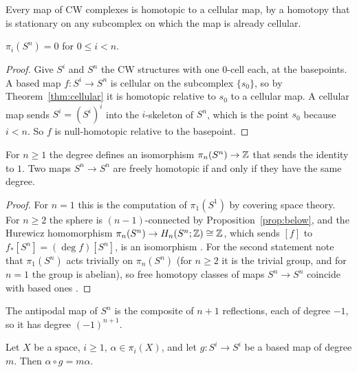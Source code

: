 \begin{theorem}\label{thm:cellular}
Every map of CW complexes is homotopic to a cellular map, by a homotopy that is stationary on any subcomplex on which the map is already cellular.
\end{theorem}

\begin{proposition}\label{prop:below}
$\pi_i(S^n)=0$ for $0\le i<n$.
\end{proposition}

\begin{proof}
Give $S^i$ and $S^n$ the CW structures with one $0$-cell each, at the basepoints. A based map $f\colon S^i\to S^n$ is cellular on the subcomplex $\{s_0\}$, so by Theorem~\ref{thm:cellular} it is homotopic relative to $s_0$ to a cellular map. A cellular map sends $S^i=(S^i)^i$ into the $i$-skeleton of $S^n$, which is the point $s_0$ because $i<n$. So $f$ is null-homotopic relative to the basepoint.
\end{proof}

\begin{proposition}\label{prop:degree}
For $n\ge1$ the degree defines an isomorphism $\pi_n(S^n)\to\mathbb{Z}$ that sends the identity to $1$. Two maps $S^n\to S^n$ are freely homotopic if and only if they have the same degree.
\end{proposition}

\begin{proof}
For $n=1$ this is the computation of $\pi_1(S^1)$ by covering space theory. For $n\ge2$ the sphere is $(n-1)$-connected by Proposition~\ref{prop:below}, and the Hurewicz homomorphism $\pi_n(S^n)\to H_n(S^n;\mathbb{Z})\cong\mathbb{Z}$, which sends $[f]$ to $f_*[S^n]=(\deg f)[S^n]$, is an isomorphism \cite[Theorem~4.32]{Hat02}. For the second statement note that $\pi_1(S^n)$ acts trivially on $\pi_n(S^n)$ (for $n\ge2$ it is the trivial group, and for $n=1$ the group is abelian), so free homotopy classes of maps $S^n\to S^n$ coincide with based ones \cite[Section~4.A]{Hat02}.
\end{proof}

The antipodal map of $S^n$ is the composite of $n+1$ reflections, each of degree $-1$, so it has degree $(-1)^{n+1}$.

\begin{lemma}\label{lem:precompose}
Let $X$ be a space, $i\ge1$, $\alpha\in\pi_i(X)$, and let $g\colon S^i\to S^i$ be a based map of degree $m$. Then $\alpha\circ g=m\alpha$.
\end{lemma}

